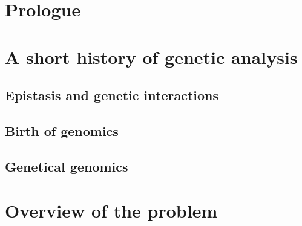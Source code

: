 \section*{Prologue}

\section*{A short history of genetic analysis}

\subsection*{Epistasis and genetic interactions}

\subsection*{Birth of genomics}

\subsection*{Genetical genomics}

\section*{Overview of the problem}

